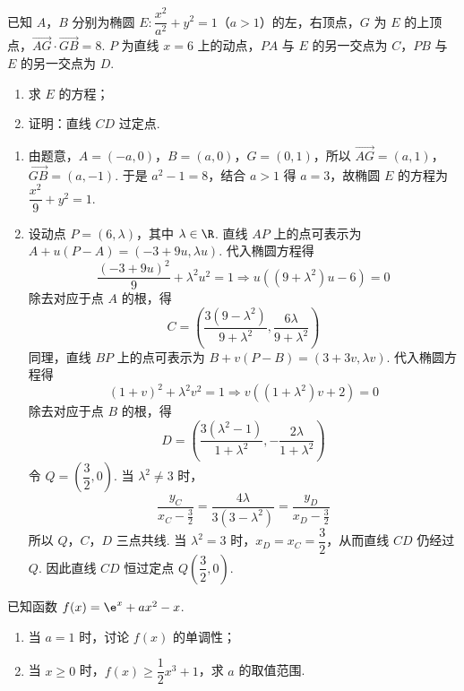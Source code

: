 \begin{problem}
已知 \(A\)，\(B\) 分别为椭圆 \(E:\dfrac{x^2}{a^2}+y^2=1\)（\(a>1\)）的左，右顶点，\(G\) 为 \(E\) 的上顶点，\(\overrightarrow{AG}\cdot \overrightarrow{GB}=8\). \(P\) 为直线 \(x=6\) 上的动点，\(PA\) 与 \(E\) 的另一交点为 \(C\)，\(PB\) 与 \(E\) 的另一交点为 \(D\).

\begin{enumerate}
\item 求 \(E\) 的方程；

\item 证明：直线 \(CD\) 过定点.
\end{enumerate}
\end{problem}

\begin{solution}
\begin{enumerate}
\item 由题意，\(A=(-a,0)\)，\(B=(a,0)\)，\(G=(0,1)\)，所以
\(\overrightarrow{AG}=(a,1)\)，\(\overrightarrow{GB}=(a,-1)\). 于是 \(a^2-1=8\)，结合 \(a>1\) 得 \(a=3\)，故椭圆 \(E\) 的方程为 \(\dfrac{x^2}{9}+y^2=1\).

\item 设动点 \(P=(6,\lambda)\)，其中 \(\lambda\in\R\). 直线 \(AP\) 上的点可表示为
\(A+u(P-A)=(-3+9u,\lambda u)\). 代入椭圆方程得
\[
\frac{(-3+9u)^2}{9}+\lambda^2u^2=1\Longrightarrow u\left((9+\lambda^2)u-6\right)=0
\]
除去对应于点 \(A\) 的根，得
\[
C=\left(\frac{3(9-\lambda^2)}{9+\lambda^2},\frac{6\lambda}{9+\lambda^2}\right)
\]
同理，直线 \(BP\) 上的点可表示为 \(B+v(P-B)=(3+3v,\lambda v)\). 代入椭圆方程得
\[
(1+v)^2+\lambda^2v^2=1\Longrightarrow v\left((1+\lambda^2)v+2\right)=0
\]
除去对应于点 \(B\) 的根，得
\[
D=\left(\frac{3(\lambda^2-1)}{1+\lambda^2},-\frac{2\lambda}{1+\lambda^2}\right)
\]
令 \(Q=\left(\dfrac{3}{2},0\right)\). 当 \(\lambda^2\ne3\) 时，
\[
\frac{y_C}{x_C-\frac{3}{2}}=\frac{4\lambda}{3(3-\lambda^2)}=\frac{y_D}{x_D-\frac{3}{2}}
\]
所以 \(Q\)，\(C\)，\(D\) 三点共线. 当 \(\lambda^2=3\) 时，\(x_D=x_C=\dfrac{3}{2}\)，从而直线 \(CD\) 仍经过 \(Q\). 因此直线 \(CD\) 恒过定点 \(Q\left(\dfrac{3}{2},0\right)\).
\end{enumerate}
\end{solution}

\begin{problem}
已知函数 \(f(x)=\e^x+ax^2-x\).

\begin{enumerate}
\item 当 \(a=1\) 时，讨论 \(f(x)\) 的单调性；

\item 当 \(x\ge 0\) 时，\(f(x)\ge \dfrac{1}{2}x^3+1\)，求 \(a\) 的取值范围.
\end{enumerate}
\end{problem}


